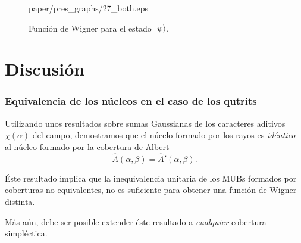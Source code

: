 \documentclass[10pt,spanish]{beamer}
\begin{document}
\begin{frame}
\begin{figure}[h]
{{          paper/pres_graphs/27_both.eps
        }
      }
      \caption{
        Función de Wigner para el estado $\ket{\psi}$.
      }
      \label{fig:wigner-kantor-3-3-s1}
    \end{figure}
  \end{frame}

  \section{Discusión}

  \begin{frame}
    \frametitle{Equivalencia de los núcleos en el caso de
      los qutrits}

    Utilizando unos resultados sobre sumas Gaussianas de
    los caracteres aditivos $\chi(\alpha)$ del campo,
    demostramos que el núcelo formado por los rayos es
    \textit{idéntico} al núcleo formado por la cobertura de
    Albert
    \begin{equation}
      \hat A(\alpha,\beta) = \hat A'(\alpha,\beta).
    \end{equation}

    \vspace{15pt}

    \pause

    Éste resultado implica que la inequivalencia unitaria
    de los MUBs formados por coberturas no equivalentes, no
    es suficiente para obtener una función de Wigner
    distinta.

    \vspace{5pt}

    Más aún, debe ser posible extender éste resultado a
    \textit{cualquier} cobertura simpléctica. 
  \end{frame}
\end{document}
